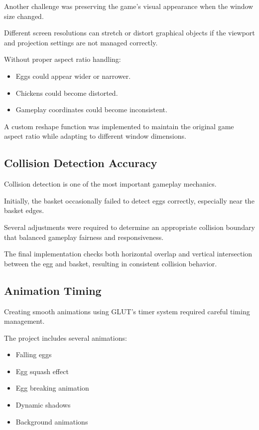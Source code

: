 \documentclass[12pt,a4paper]{report}
\begin{document}
Another challenge was preserving the game's visual appearance when the window size changed.

Different screen resolutions can stretch or distort graphical objects if the viewport and projection settings are not managed correctly.

Without proper aspect ratio handling:

\begin{itemize}
\item Eggs could appear wider or narrower.
\item Chickens could become distorted.
\item Gameplay coordinates could become inconsistent.
\end{itemize}

A custom reshape function was implemented to maintain the original game aspect ratio while adapting to different window dimensions.

\subsection*{Collision Detection Accuracy}

Collision detection is one of the most important gameplay mechanics.

Initially, the basket occasionally failed to detect eggs correctly, especially near the basket edges.

Several adjustments were required to determine an appropriate collision boundary that balanced gameplay fairness and responsiveness.

The final implementation checks both horizontal overlap and vertical intersection between the egg and basket, resulting in consistent collision behavior.

\subsection*{Animation Timing}

Creating smooth animations using GLUT's timer system required careful timing management.

The project includes several animations:

\begin{itemize}
\item Falling eggs
\item Egg squash effect
\item Egg breaking animation
\item Dynamic shadows
\item Background animations
\end{itemize}
\end{document}

